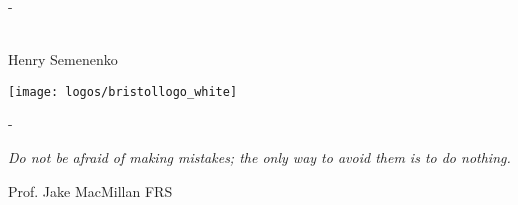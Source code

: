 \begin{titlingpage}
\pagecolor{bristol-red}
\begin{SingleSpace}
\calccentering{\unitlength} 
\begin{adjustwidth*}{\unitlength}{-\unitlength}
\vspace*{5mm}
\begin{center}
\vspace{20mm}
\begin{minipage}{10cm}
\HUGE \color{white} \textbf{\mytitle}
\end{minipage}\\
\vspace{30mm}
{\huge\color{white}Henry Semenenko\textsc{}}\\
\vspace*{\fill}


\vspace{20mm}

\texttt{[image: logos/bristollogo\_white]}\\
\end{center}
\end{adjustwidth*}
\end{SingleSpace}
\clearpage
\pagecolor{white}
\clearemptydoublepage
\pagecolor{bristol-red}
\thispagestyle{plain}

\calccentering{\unitlength} 

\begin{adjustwidth*}{\unitlength}{-\unitlength}

\vspace*{0mm}

\begin{center}

\vspace{10mm}


\begin{minipage}{9cm}
\color{white}
\DoubleSpacing
\textit{\Large Do not be afraid of making mistakes; the only way to avoid them is to do nothing.}
\begin{flushright}Prof. Jake MacMillan FRS\end{flushright}
\end{minipage}\\


\end{center}
\end{adjustwidth*}
\end{titlingpage}
